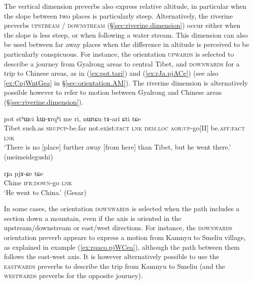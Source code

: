 The vertical dimension preverbs also express relative altitude, in particular when the slope between two places is particularly steep. Alternatively, the riverine preverbs \textsc{upstream} / \textsc{downstream} (§\ref{sec:riverine.dimension}) occur either when the slope is less steep, or when following a water stream. This dimension can also be used between far away places when the difference in altitude is perceived to be particularly conspicuous. For instance, the orientation \textsc{upwards} is selected to describe a journey from Gyalrong areas to central Tibet, and \textsc{downwards} for a trip to Chinese areas, as in (\ref{ex:pot.tari}) and (\ref{ex:rJa.pjACe}) (see also \ref{ex:CpjWntGea} in §\ref{sec:orientation.AM}). The riverine dimension is alternatively possible however to refer to motion between Gyalrong and Chinese areas (§\ref{sec:riverine.dimension}).

\begin{exe}
\ex \label{ex:pot.tari}
\gll  pot stʰɯci kɯ-ɤrqʰi me ri, nɯtɕu tɤ-ari ɕti tɕe \\
Tibet such.as \textsc{sbj}:\textsc{pcp}-be.far not.exist:\textsc{fact} \textsc{lnk} \textsc{dem}.\textsc{loc} \textsc{aor}:\textsc{up}-go[II] be.\textsc{aff}:\textsc{fact} \textsc{lnk} \\
\glt `There is no [place] further away [from here] than Tibet, but he went there.' (meimeidegushi)
\end{exe}

\begin{exe}
\ex \label{ex:rJa.pjACe}
\gll rɟa pjɤ-ɕe tɕe \\
Chine \textsc{ifr}:\textsc{down}-go \textsc{lnk} \\
\glt `He went to China.' (Gesar) 
\end{exe}

In some cases, the orientation \textsc{downwards} is selected when the path includes a section down a mountain, even if the axis is oriented in the upstream/downstream or east/west directions. For instance, the \textsc{downwards} orientation preverb appears to express a motion from  Kamnyu to   Smeliu village, as explained in example (\ref{ex:rqaco.pjWCea}), although the path between them follows the east-west axis. It is however alternatively possible to use the \textsc{eastwards} preverbs to describe the trip from Kamnyu to Smeliu (and the \textsc{westwards} preverbs for the opposite journey).


